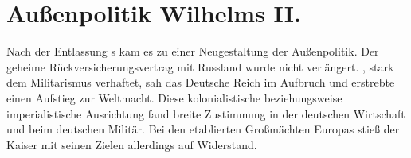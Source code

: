 \section{Außenpolitik Wilhelms II.}

Nach der Entlassung s  kam
es zu einer Neugestaltung der Außenpolitik. Der geheime
Rückversicherungsvertrag mit Russland wurde nicht verlängert.
, stark dem Militarismus verhaftet, sah das
Deutsche Reich im Aufbruch und erstrebte einen Aufstieg zur Weltmacht.
Diese kolonialistische beziehungsweise imperialistische Ausrichtung
fand breite Zustimmung in der deutschen Wirtschaft und beim deutschen
Militär. Bei den etablierten Großmächten Europas stieß der Kaiser mit
seinen Zielen allerdings auf Widerstand.


